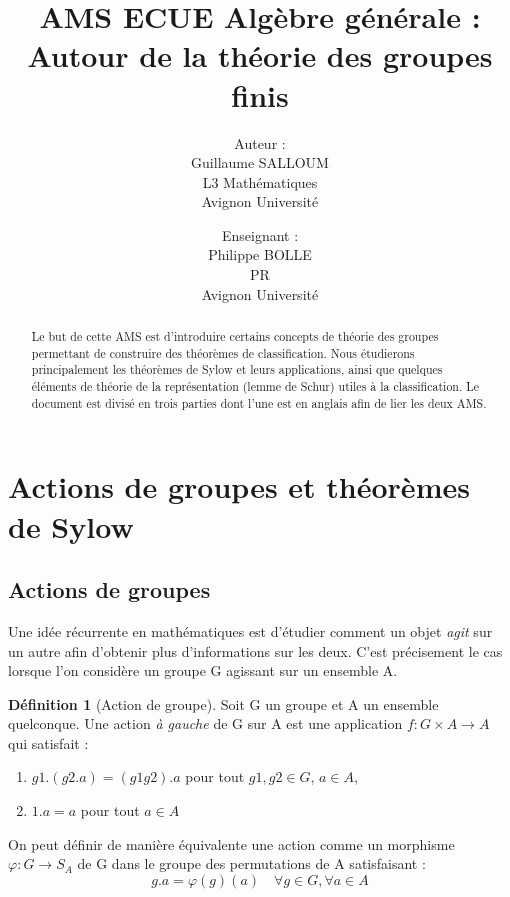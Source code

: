 \documentclass[french]{article}
\title{AMS ECUE Algèbre générale : Autour de la théorie des groupes finis}
\author{Auteur :\\
	Guillaume SALLOUM \\ 
	L3 Mathématiques \\ 
	Avignon Université
	\and
	Enseignant : \\
	Philippe BOLLE \\
	PR \\
	Avignon Université}
\date{}
\theoremstyle{definition}
\newtheorem{definition}[subsubsection]{Définition}
\theoremstyle{plain}
\theoremstyle{plain}
\theoremstyle{plain}
\theoremstyle{plain}
\theoremstyle{plain}
\begin{document}
\maketitle
\begin{abstract}
	Le but de cette AMS est d'introduire certains concepts de théorie des groupes permettant de construire des théorèmes de classification.
	Nous étudierons principalement les théorèmes de Sylow et leurs applications, ainsi que quelques éléments de théorie de la représentation  (lemme de Schur) utiles à la classification.
	Le document est divisé en trois parties dont l'une est en anglais afin de lier les deux AMS.  
\end{abstract}


\tableofcontents
\clearpage
\section{Actions de groupes et théorèmes de Sylow}
\subsection{Actions de groupes}

\par Une idée récurrente en mathématiques est d'étudier comment un objet \textit{agit} sur un autre afin d'obtenir plus d'informations sur les deux. C'est précisement le cas lorsque l'on considère un groupe G agissant sur un ensemble A.

\begin{definition}[Action de groupe]
	Soit G un groupe et A un ensemble quelconque. Une action \textit{à gauche} de G sur A est une application \( f : G \times A \rightarrow A\) qui satisfait :
	\begin{enumerate}[label = (\roman*)]
		\item \(g1.(g2.a) = (g1g2).a \) pour tout \(g1,g2 \in G\), \(a \in A\),
		\item \(1.a = a\) pour tout \(a \in A\)
	\end{enumerate}

	On peut définir de manière équivalente \cite[p. ~43]{dummit2003abstract} une action comme un morphisme \( \varphi : G \rightarrow S_{A} \) de G dans le groupe des permutations de A satisfaisant :
	\begin{equation}
		g.a = \varphi(g)(a) \quad \forall g \in G, \forall a \in A
	\end{equation}
\end{definition}
\end{document}
